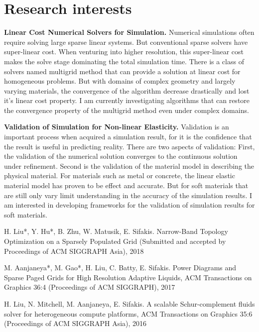 \documentclass[11pt]{article}
\begin{document}
\section*{Research interests}

\textbf{Linear Cost Numerical Solvers for Simulation.} Numerical simulations often require solving large sparse linear systems. But conventional sparse solvers have super-linear cost. When venturing into higher resolution, this super-linear cost makes the solve stage dominating the total simulation time. There is a class of solvers named multigrid method that can provide a solution at linear cost for homogeneous problems. But with domains of complex geometry and largely varying materials, the convergence of the algorithm decrease drastically and lost it's linear cost property. I am currently investigating algorithms that can restore the convergence property of the multigrid method even under complex domains.

\textbf{Validation of Simulation for Non-linear Elasticity.} Validation is an important process when acquired a simulation result, for it is the confidence that the result is useful in predicting reality. There are two aspects of validation: First, the validation of the numerical solution converges to the continuous solution under refinement. Second is the validation of the material model in describing the physical material. For materials such as metal or concrete, the linear elastic material model has proven to be effect and accurate. But for soft materials that are still only vary limit understanding in the accuracy of the simulation results. I am interested in developing frameworks for the validation of simulation results for soft materials.

\begin{thebibliography}{99}

 H. Liu*, Y. Hu*, B. Zhu, W. Matusik, E. Sifakis. Narrow-Band Topology Optimization on a Sparsely Populated Grid (Submitted and accepted by Proceedings of ACM SIGGRAPH Asia), 2018

M. Aanjaneya*, M. Gao*, H. Liu, C. Batty, E. Sifakis. Power Diagrams and Sparse Paged Grids for High Resolution Adaptive Liquids, ACM Transactions on Graphics 36:4 (Proceedings of ACM SIGGRAPH), 2017

H. Liu, N. Mitchell, M. Aanjaneya, E. Sifakis. A scalable Schur-complement fluids solver for heterogeneous compute platforms,  ACM Transactions on Graphics 35:6 (Proceedings of ACM SIGGRAPH Asia), 2016
\end{thebibliography}
\end{document}
